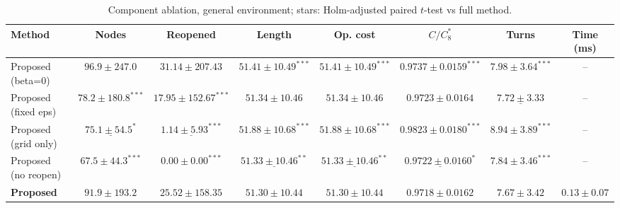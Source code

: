 \begin{table}[htbp]
\centering\small
\caption{Component ablation, general environment; stars: Holm-adjusted paired $t$-test vs full method.}\label{tab:abl_general}
\begin{tabular}{lccccccc}
\toprule
Method & Nodes & Reopened & Length & Op. cost & $C/C^*_8$ & Turns & Time (ms) \\
\midrule
Proposed (beta=0) & $96.9\pm247.0$ & $31.14\pm207.43$ & $51.41\pm10.49^{***}$ & $51.41\pm10.49^{***}$ & $0.9737\pm0.0159^{***}$ & $7.98\pm3.64^{***}$ & -- \\
Proposed (fixed eps) & $78.2\pm180.8^{***}$ & $17.95\pm152.67^{***}$ & $51.34\pm10.46$ & $51.34\pm10.46$ & $0.9723\pm0.0164$ & $\underline{7.72\pm3.33}$ & -- \\
Proposed (grid only) & $\underline{75.1\pm54.5^{*}}$ & $\underline{1.14\pm5.93^{***}}$ & $51.88\pm10.68^{***}$ & $51.88\pm10.68^{***}$ & $0.9823\pm0.0180^{***}$ & $8.94\pm3.89^{***}$ & -- \\
Proposed (no reopen) & $\mathbf{67.5\pm44.3^{***}}$ & $\mathbf{0.00\pm0.00^{***}}$ & $\underline{51.33\pm10.46^{**}}$ & $\underline{51.33\pm10.46^{**}}$ & $\underline{0.9722\pm0.0160^{*}}$ & $7.84\pm3.46^{***}$ & -- \\
\textbf{Proposed} & $91.9\pm193.2$ & $25.52\pm158.35$ & $\mathbf{51.30\pm10.44}$ & $\mathbf{51.30\pm10.44}$ & $\mathbf{0.9718\pm0.0162}$ & $\mathbf{7.67\pm3.42}$ & $\mathbf{0.13\pm0.07}$ \\
\bottomrule
\end{tabular}
\end{table}
